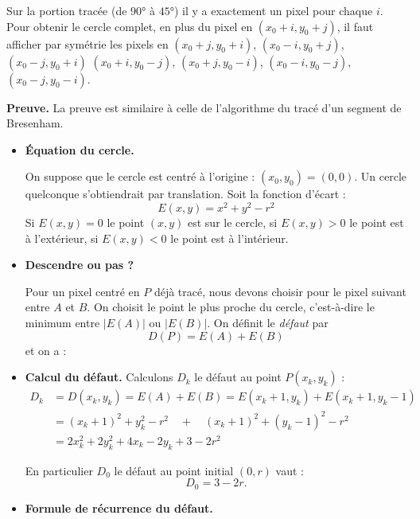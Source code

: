 \documentclass[11pt,class=report,crop=false]{standalone}
\begin{document}
Sur la portion tracée (de $\ang{90}$ à $\ang{45}$) il y a exactement un pixel pour chaque $i$. Pour obtenir le cercle complet, en plus du pixel en $(x_0+i,y_0+j)$, il faut afficher par symétrie les pixels en 
$(x_0+j,y_0+i)$, $(x_0-i,y_0+j)$, $(x_0-j,y_0+i)$
$(x_0+i,y_0-j)$, $(x_0+j,y_0-i)$, $(x_0-i,y_0-j)$, $(x_0-j,y_0-i)$.


\textbf{Preuve.}
La preuve est similaire à celle de l'algorithme du tracé d'un segment de Bresenham.

\begin{itemize}
	\item \textbf{Équation du cercle.}
	
On suppose que le cercle est centré à l'origine : $(x_0,y_0)=(0,0)$. Un cercle quelconque s'obtiendrait par translation.
Soit la fonction d'écart :
$$E(x,y) = x^2 + y^2 -r^2$$
Si $E(x,y)=0$ le point $(x,y)$ est sur le cercle, si $E(x,y)>0$ le point est à l'extérieur, si $E(x,y)<0$ le point est à l'intérieur.


	\item \textbf{Descendre ou pas ?}

Pour un pixel centré en $P$ déjà tracé, nous devons choisir pour le pixel suivant entre $A$ et $B$. 
On choisit le point le plus proche du cercle, c'est-à-dire le minimum entre 
$|E(A)|$ ou $|E(B)|$.
On définit le \emph{défaut} par 
$$D(P) = E(A)+E(B)$$ 
et on a :

\medskip


\item \textbf{Calcul du défaut.}
Calculons $D_k$ le défaut au point $P(x_k,y_k)$ :
\begin{align*}
	D_k 
	&= D(x_k,y_k) = E(A) + E(B) = E(x_k+1,y_k)+E(x_k+1,y_k-1) \\
	&= (x_k + 1)^2 + y_k^2-r^2 \quad + \quad  (x_k + 1)^2 + (y_k-1)^2-r^2\\
	&= 2x_k^2 +2y_k^2 + 4x_k - 2y_k + 3 -2r^2
\end{align*}	

En particulier $D_0$ le défaut au point initial $(0,r)$ vaut :
$$D_0 = 3 - 2r.$$


\item \textbf{Formule de récurrence du défaut.}


\end{itemize}
\end{document}

